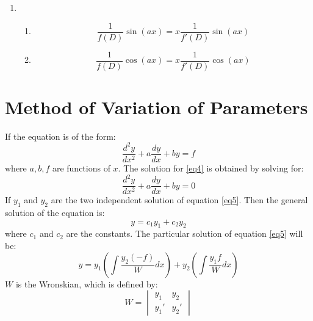 \begin{enumerate}
	\item \begin{enumerate}
		\item \begin{equation} \dfrac{1}{f(D)} \sin (ax) = x\dfrac{1}{f'(D)} \sin (ax)\end{equation}

		\item \begin{equation} \dfrac{1}{f(D)} \cos (ax) = x\dfrac{1}{f'(D)} \cos (ax)\end{equation}
	\end{enumerate}
\end{enumerate}


\section{Method of Variation of Parameters}
If the equation is of the form:
\begin{equation}
	\dfrac{d^2y}{dx^2}+a\dfrac{dy}{dx}+by=f\label{eq4}
\end{equation}
where $a,b,f$ are functions of $x$. The solution for \ref{eq4} is obtained by solving for:
\begin{equation}\label{eq5}
	\dfrac{d^2y}{dx^2}+a\dfrac{dy}{dx}+by=0
\end{equation}
If $y_1$ and $y_2$ are the two independent solution of equation \ref{eq5}.\newline
Then the general solution of the equation is:
\begin{equation}
	y=c_1y_1+c_2y_2
\end{equation}
where $c_1$ and $c_2$ are the constants.\newline
The particular solution of equation \ref{eq5} will be:
\begin{equation}
	y=y_1 \left(\int \dfrac{y_2(-f)}{W}dx\right)+y_2\left(\int \dfrac{y_1 f}{W}dx\right)
\end{equation}
$W$ is the Wronskian, which is defined by:
\begin{equation}
	W=\begin{vmatrix}
		y_1&y_2\\
		y_1'&y_2'
	\end{vmatrix}
\end{equation}


